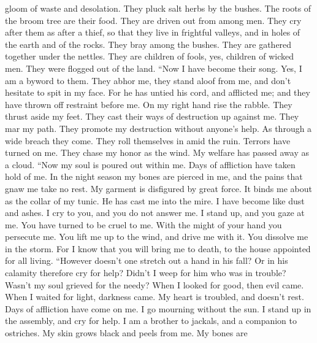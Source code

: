 gloom of waste and desolation.  They pluck salt herbs by
the bushes. The roots of the broom tree are their food. 
They are driven out from among men. They cry after them as after a
thief,  so that they live in frightful valleys, and in
holes of the earth and of the rocks.  They bray among the
bushes. They are gathered together under the nettles. 
They are children of fools, yes, children of wicked men. They were
flogged out of the land.  ``Now I have become their song.
Yes, I am a byword to them.  They abhor me, they stand
aloof from me, and don't hesitate to spit in my face. 
For he has untied his cord, and afflicted me; and they have thrown off
restraint before me.  On my right hand rise the rabble.
They thrust aside my feet. They cast their ways of destruction up
against me.  They mar my path. They promote my
destruction without anyone's help.  As through a wide
breach they come. They roll themselves in amid the ruin. 
Terrors have turned on me. They chase my honor as the wind. My welfare
has passed away as a cloud.  ``Now my soul is poured out
within me. Days of affliction have taken hold of me.  In
the night season my bones are pierced in me, and the pains that gnaw me
take no rest.  My garment is disfigured by great force.
It binds me about as the collar of my tunic.  He has cast
me into the mire. I have become like dust and ashes.  I
cry to you, and you do not answer me. I stand up, and you gaze at me.
 You have turned to be cruel to me. With the might of
your hand you persecute me.  You lift me up to the wind,
and drive me with it. You dissolve me in the storm.  For
I know that you will bring me to death, to the house appointed for all
living.  ``However doesn't one stretch out a hand in his
fall? Or in his calamity therefore cry for help?  Didn't
I weep for him who was in trouble? Wasn't my soul grieved for the needy?
 When I looked for good, then evil came. When I waited
for light, darkness came.  My heart is troubled, and
doesn't rest. Days of affliction have come on me.  I go
mourning without the sun. I stand up in the assembly, and cry for help.
 I am a brother to jackals, and a companion to ostriches.
 My skin grows black and peels from me. My bones are
